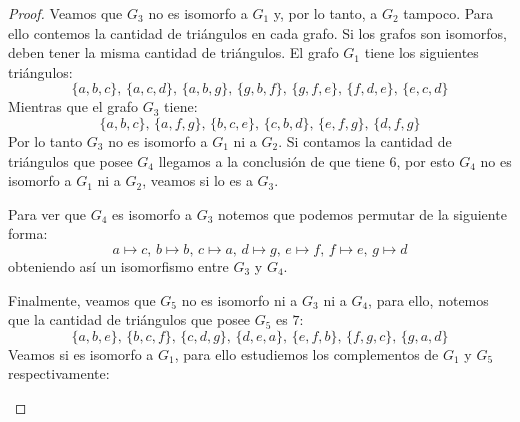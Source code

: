 \begin{proof}
    Veamos que \( G_3 \) no es isomorfo a \( G_1 \) y, por lo tanto, a \( G_2 \) tampoco. Para ello contemos la cantidad de triángulos en cada grafo. Si los grafos son isomorfos, deben tener la misma cantidad de triángulos.
    El grafo \( G_1 \) tiene los siguientes triángulos: \[
        \{ a,b,c \}, \,
        \{ a,c,d \}, \,
        \{ a,b,g \}, \,
        \{ g,b,f \}, \,
        \{ g,f,e \}, \,
        \{ f,d,e \}, \,
        \{ e,c,d \}
    \]
    Mientras que el grafo \( G_3 \) tiene: \[
        \{ a,b,c \}, \,
        \{ a,f,g \}, \,
        \{ b,c,e \}, \,
        \{ c,b,d \}, \,
        \{ e,f,g \}, \,
        \{ d,f,g \}
    \]
    Por lo tanto \( G_3 \) no es isomorfo a \( G_1 \) ni a \( G_2 \).
    Si contamos la cantidad de triángulos que posee \( G_4 \) llegamos a la conclusión de que tiene \( 6 \), por esto \( G_4 \) no es isomorfo a \( G_1 \) ni a \( G_2 \), veamos si lo es a \( G_3 \).

    Para ver que \( G_4 \) es isomorfo a \( G_3 \) notemos que podemos permutar de la siguiente forma:\[
        a \mapsto c, \,
        b \mapsto b, \,
        c \mapsto a, \,
        d \mapsto g, \,
        e \mapsto f, \,
        f \mapsto e, \,
        g \mapsto d
    \]
    obteniendo así un isomorfismo entre \( G_3 \) y \( G_4 \).

    Finalmente, veamos que \( G_5 \) no es isomorfo ni a \( G_3 \) ni a \( G_4 \), para ello, notemos que la cantidad de triángulos que posee \( G_5 \) es \( 7 \): \[
        \{ a,b,e \}, \, \{b,c,f\}, \, \{c,d,g\}, \, \{d,e,a\}, \, \{e,f,b\}, \, \{f,g,c\}, \, \{g,a,d\}
    \]
    Veamos si es isomorfo a \( G_1 \), para ello estudiemos los complementos de \( G_1 \) y \( G_5 \) respectivamente:
    \begin{center}
\end{center}
\end{proof}
